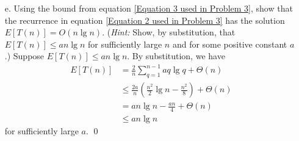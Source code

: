 \documentclass[12pt,reqno]{amsart}
\newif\ifanswer
\begin{document}
\begin{enumerate}[1.]
\begin{enumerate}
    \item[e.] Using the bound from equation \ref{Equation 3 used in Problem 3}, show that the recurrence in equation \ref{Equation 2 used in Problem 3} has the solution $E[T(n)] = O(n\lg{n})$. (\textit{Hint:} Show, by substitution, that $E[T(n)] \leq an\lg{n}$ for sufficiently large $n$ and for some positive constant $a$.)
    \ifanswer
    \noindent {\bf \\Solution}
    Suppose $E[T(n)] \leq an\lg{n}$. By substitution, we have
    \begin{align*}
    E[T(n)] &= \frac{2}{n}\sum_{q = 1}^{n - 1}{aq\lg{q}} + \Theta(n)\\
    &\leq \frac{2a}{n}\left(\frac{n^2}{2}\lg{n} - \frac{n^2}{8}\right) + \Theta(n)\\
    &= an\lg{n} - \frac{an}{4} + \Theta(n)\\
    &\leq an\lg{n}
    \end{align*}
    for sufficiently large $a$. \qed
\end{enumerate}
\vspace{1cm}




\end{enumerate}
\end{document}
